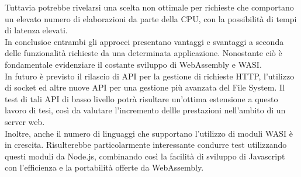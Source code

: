 Tuttavia potrebbe rivelarsi una scelta non ottimale per richieste che comportano un elevato numero di elaborazioni da parte della CPU, con la possibilità di tempi di latenza elevati.
\\In conclusioe entrambi gli approcci presentano vantaggi e svantaggi a seconda delle funzionalità richieste da una determinata applicazione.
Nonostante ciò è fondamentale evidenziare il costante sviluppo di WebAssembly e WASI.
\\In futuro è previsto il rilascio di API per la gestione di richieste HTTP, l'utilizzo di socket ed altre nuove API per una gestione più avanzata del File System.
Il test di tali API di basso livello potrà risultare un'ottima estensione a questo lavoro di tesi, così da valutare l'incremento dellle prestazioni nell'ambito di un server web.
\\Inoltre, anche il numero di linguaggi che supportano l'utilizzo di moduli WASI è in crescita.
Risulterebbe particolarmente interessante condurre test utilizzando questi moduli da Node.js, combinando così la facilità di sviluppo di Javascript con l'efficienza e la portabilità offerte da WebAssembly.